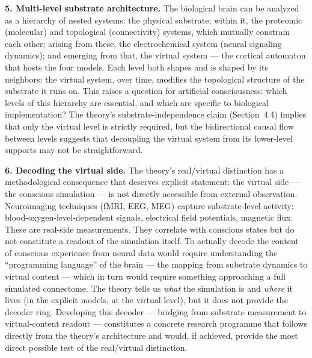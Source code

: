 \documentclass[12pt]{article}
\begin{document}
\textbf{5. Multi-level substrate architecture.} The biological brain can be analyzed as a hierarchy of nested systems: the physical substrate; within it, the proteomic (molecular) and topological (connectivity) systems, which mutually constrain each other; arising from these, the electrochemical system (neural signaling dynamics); and emerging from that, the virtual system --- the cortical automaton that hosts the four models. Each level both shapes and is shaped by its neighbors: the virtual system, over time, modifies the topological structure of the substrate it runs on. This raises a question for artificial consciousness: which levels of this hierarchy are essential, and which are specific to biological implementation? The theory's substrate-independence claim (Section~4.4) implies that only the virtual level is strictly required, but the bidirectional causal flow between levels suggests that decoupling the virtual system from its lower-level supports may not be straightforward.

\textbf{6. Decoding the virtual side.} The theory's real/virtual distinction has a methodological consequence that deserves explicit statement: the virtual side --- the conscious simulation --- is not directly accessible from external observation. Neuroimaging techniques (fMRI, EEG, MEG) capture substrate-level activity: blood-oxygen-level-dependent signals, electrical field potentials, magnetic flux. These are real-side measurements. They correlate with conscious states but do not constitute a readout of the simulation itself. To actually decode the content of conscious experience from neural data would require understanding the ``programming language'' of the brain --- the mapping from substrate dynamics to virtual content --- which in turn would require something approaching a full simulated connectome. The theory tells us \emph{what} the simulation is and \emph{where} it lives (in the explicit models, at the virtual level), but it does not provide the decoder ring. Developing this decoder --- bridging from substrate measurement to virtual-content readout --- constitutes a concrete research programme that follows directly from the theory's architecture and would, if achieved, provide the most direct possible test of the real/virtual distinction.
\end{document}
